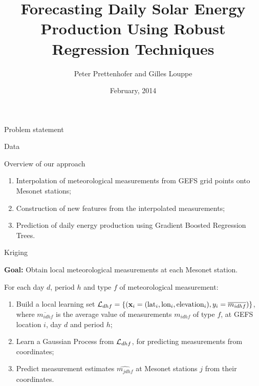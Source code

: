 \documentclass[handout]{beamer}
\title{Forecasting Daily Solar Energy Production Using Robust Regression Techniques}
\author{Peter Prettenhofer and Gilles Louppe}
\institute{Graz University of Technology, Austria\\
Université de Liège, Belgium}
\date{February, 2014}
\begin{document}

\begin{frame}
\titlepage
\end{frame}



\begin{frame}{Problem statement}

\end{frame}



\begin{frame}{Data}

\end{frame}



\begin{frame}{Overview of our approach}

\begin{enumerate}
\item Interpolation of meteorological measurements from GEFS grid points onto Mesonet stations;
\item Construction of new features from the interpolated measurements;
\item Prediction of daily energy production using Gradient Boosted Regression Trees.
\end{enumerate}

\end{frame}



\begin{frame}{Kriging}

\textbf{Goal:} Obtain local meteorological measurements at each Mesonet station.

\vskip0.25cm

For each day $d$, period $h$ and type $f$ of meteorological measurement:

\begin{enumerate}

\item Build a local learning set ${\cal L}_{dhf} = \{ (\mathbf{x}_i = (\text{lat}_i,
\text{lon}_i, \text{elevation}_i), y_i = \overline{m_{idhf}} ) \}$,  where
$\overline{m_{idhf}}$ is the average value of measurements $m_{idhf}$ of type $f$, at GEFS location $i$, day $d$ and period $h$;

\item Learn a Gaussian Process from ${\cal L}_{dhf}$, for predicting measurements from coordinates;

\item Predict measurement estimates $\widehat{m_{jdhf}}$ at Mesonet stations $j$ from their coordinates.

\end{enumerate}

\end{frame}
\end{document}
